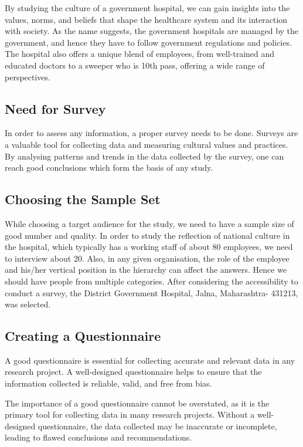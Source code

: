 \documentclass{article}
\begin{document}
By studying the culture of a government hospital, we can gain insights into the values, norms, and beliefs that shape the healthcare system and its interaction with society. As the name suggests, the government hospitals are managed by the government, and hence they have to follow government regulations and policies\cite{ref: IPCH}. The hospital also offers a unique blend of employees, from well-trained and educated doctors to a sweeper who is 10th pass, offering a wide range of perspectives.

\subsection{Need for Survey}

In order to assess any information, a proper survey needs to be done. Surveys are a valuable tool for collecting data and measuring cultural values and practices. By analysing patterns and trends in the data collected by the survey, one can reach good conclusions which form the basis of any study.

\subsection{Choosing the Sample Set}

While choosing a target audience for the study, we need to have a sample size of good number and quality. In order to study the reflection of national culture in the hospital, which typically has a working staff of about 80 employees, we need to interview about 20. Also, in any given organisation, the role of the employee and his/her vertical position in the hierarchy can affect the answers. Hence we should have people from multiple categories. After considering the accessibility to conduct a survey, the District Government Hospital, Jalna, Maharashtra- 431213, was selected.

\subsection{Creating a Questionnaire}

A good questionnaire is essential for collecting accurate and relevant data in any research project. A well-designed questionnaire helps to ensure that the information collected is reliable, valid, and free from bias.

The importance of a good questionnaire cannot be overstated, as it is the primary tool for collecting data in many research projects. Without a well-designed questionnaire, the data collected may be inaccurate or incomplete, leading to flawed conclusions and recommendations.
\end{document}
